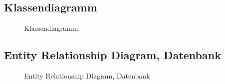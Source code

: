 \documentclass[11pt, a4paper]{article}
\begin{document}
    \subsection{Klassendiagramm}
      \begin{figure}[h!]
        \caption{Klassendiagramm}
        \label{fig:classdiagram}
      \end{figure}
      \newpage

    \subsection{Entity Relationship Diagram, Datenbank}
      \begin{figure}[h!]
        \caption{Entity Relationship Diagram, Datenbank}
        \label{fig:datadiagram}
      \end{figure}
      \newpage
\end{document}
